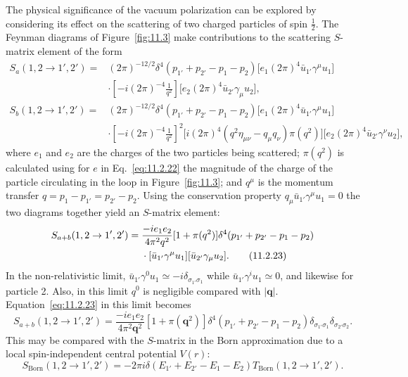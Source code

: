 The physical significance of the vacuum polarization can be explored by
considering its effect on the scattering of two charged particles of spin
$\tfrac12$. The Feynman diagrams of Figure~\ref{fig:11.3} make contributions to the
scattering $S$-matrix element of the form
\begin{align*}
  S_a(1,2\to1',2')={}&(2\pi)^{-12/2}\delta^4(p_{1'}+p_{2'}-p_1-p_2)
  \bigl[e_1(2\pi)^4\bar u_{1'}\gamma^\mu u_1\bigr]\\
  &\cdot\left[-i(2\pi)^{-4}\frac1{q^2}\right]
  \bigl[e_2(2\pi)^4\bar u_{2'}\gamma_\mu u_2\bigr],\\[4pt]
  S_b(1,2\to1',2')={}&(2\pi)^{-12/2}\delta^4(p_{1'}+p_{2'}-p_1-p_2)
  \bigl[e_1(2\pi)^4\bar u_{1'}\gamma^\mu u_1\bigr]\\
  &\cdot\left[-i(2\pi)^{-4}\frac1{q^2}\right]^2
  \bigl[i(2\pi)^4(q^2\eta_{\mu\nu}-q_\mu q_\nu)\pi(q^2)\bigr]
  \bigl[e_2(2\pi)^4\bar u_{2'}\gamma^\nu u_2\bigr],
\end{align*}
where $e_1$ and $e_2$ are the charges of the two particles being scattered;
$\pi(q^2)$ is calculated using for $e$ in Eq.~\eqref{eq:11.2.22} the magnitude of
the charge of the particle circulating in the loop in Figure~\ref{fig:11.3}; and
$q^\mu$ is the momentum transfer $q=p_1-p_{1'}=p_{2'}-p_2$. Using the
conservation property $q_\mu\bar u_{1'}\gamma^\mu u_1=0$ the two diagrams
together yield an $S$-matrix element:
\begin{align}
  S_{a+b}(1,2\to1',2')={}&\frac{-i e_1e_2}{4\pi^2q^2}
  [1+\pi(q^2)]\delta^4(p_{1'}+p_{2'}-p_1-p_2)\notag\\
  &\cdot[\bar u_{1'}\gamma^\mu u_1][\bar u_{2'}\gamma_\mu u_2].
  \tag{11.2.23}\label{eq:11.2.23}
\end{align}
In the non-relativistic limit,
$\bar u_{1'}\gamma^0u_1\simeq-i\delta_{\sigma_{1'}\sigma_1}$ while
$\bar u_{1'}\gamma^iu_1\simeq0$, and likewise for particle 2. Also, in this
limit $q^0$ is negligible compared with $|\mathbf q|$. Equation~\eqref{eq:11.2.23}
in this limit becomes
\begin{equation}
  S_{a+b}(1,2\to1',2')=\frac{-i e_1e_2}{4\pi^2\mathbf q^2}
  [1+\pi(\mathbf q^2)]\delta^4(p_{1'}+p_{2'}-p_1-p_2)
  \delta_{\sigma_{1'}\sigma_1}\delta_{\sigma_{2'}\sigma_2}.
  \tag{11.2.24}\label{eq:11.2.24}
\end{equation}
This may be compared with the $S$-matrix in the Born approximation due
to a local spin-independent central potential $V(r)$:
\begin{equation}
  S_{\mathrm{Born}}(1,2\to1',2')=-2\pi i\delta(E_{1'}+E_{2'}-E_1-E_2)
  T_{\mathrm{Born}}(1,2\to1',2').
  \tag{11.2.25}\label{eq:11.2.25}
\end{equation}
